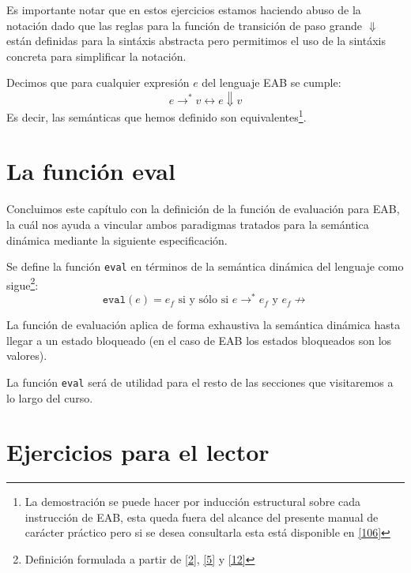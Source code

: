 	Es importante notar que en estos ejercicios estamos haciendo abuso de la notación dado que las reglas para la función de transición de paso grande $\Downarrow$ están definidas para la sintáxis abstracta pero permitimos el uso de la sintáxis concreta para simplificar la notación.

    
\begin{theorem} Decimos que para cualquier expresión $e$ del lenguaje \textsf{EAB} se cumple:
        $$e \rightarrow^*v \longleftrightarrow e \Downarrow v$$
        Es decir, las semánticas que hemos definido son equivalentes\footnote{La demostración se puede hacer por inducción estructural sobre cada instrucción de \textsf{EAB}, esta queda fuera del alcance del presente manual de carácter práctico pero si se desea consultarla esta está disponible en \hyperlink{106}{[106]}}.
    \end{theorem}


\section{La función eval}

    Concluimos este capítulo con la definición de la función de evaluación para \textsf{EAB}, la cuál nos ayuda a vincular ambos paradigmas tratados para la semántica dinámica mediante la siguiente especificación.
    \begin{definition} Se define la función \texttt{eval} en términos de la semántica dinámica del lenguaje como sigue\footnote{Definición formulada a partir de \hyperlink{2}{[2]}, \hyperlink{5}{[5]} y  \hyperlink{12}{[12]} }:
    $$\texttt{eval}(e)=e_f\mbox{ si y sólo si } e \rightarrow^* e_f \mbox{ y }e_f \nrightarrow $$

    La función de evaluación aplica de forma exhaustiva la semántica dinámica hasta llegar a un estado bloqueado (en el caso de \textsf{EAB} los estados bloqueados son los valores).
    \end{definition}
    
    La función \texttt{eval} será de utilidad para el resto de las secciones que visitaremos a lo largo del curso.
    
    \section{Ejercicios para el lector}

